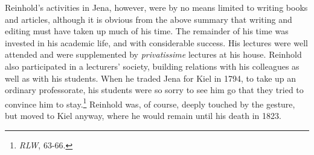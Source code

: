  Reinhold's activities in Jena, however, were by no means limited to writing books and articles, although it is obvious from the above summary that writing and editing must have taken up much of his time. The remainder of his time was invested in his academic life, and with considerable success. His lectures were well attended and were supplemented by \textit{privatissime} lectures at his house. Reinhold also participated in a lecturers' society, building relations with his colleagues as well as with his students. When he traded Jena for Kiel in 1794, to take up an ordinary professorate, his students were so sorry to see him go that they tried to convince him to stay.\footnote{ \textit{RLW}, 63{-}66. } Reinhold was, of course, deeply touched by the gesture, but moved to Kiel anyway, where he would remain until his death in 1823. 

